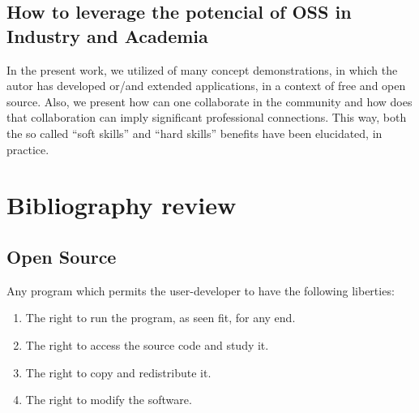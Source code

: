 \documentclass[
12pt,				%
openright,			%
oneside,			%
a4paper,			%
brazil,				%
english,			%
]{abntex2}
\begin{document}
\section{How to leverage the potencial of OSS in Industry and Academia}

In the present work, we utilized of many concept demonstrations, in
which the autor has developed or/and extended applications, in a
context of free and open source. Also, we present how can one
collaborate in the community and how does that collaboration can imply
significant professional connections. This way, both the so called
``soft skills'' and ``hard skills'' benefits have been elucidated, in practice.  


\chapter{Bibliography review}
\section{Open Source}
\label{sec:opensource}

Any program which permits the user-developer to have the following liberties:
\begin{enumerate}
\item The right to run the program, as seen fit, for any end.
\item The right to access the source code and study it.
\item The right to copy and redistribute it.
\item The right to modify the software.
\end{enumerate}

\end{document}
